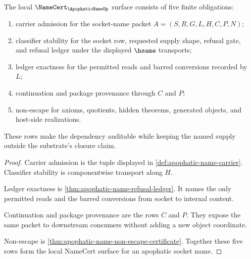 \begin{theorem}
\label{thm:apophatic-name-obligation-surface}
The local $\NameCert_{\ApophaticNameUp}$ surface consists of five finite obligations:
\begin{enumerate}
\item carrier admission for the socket-name packet $A=(S,R,G,L,H,C,P,N)$;
\item classifier stability for the socket row, requested supply shape, refusal gate, and refusal ledger under the displayed $\hsame$ transports;
\item ledger exactness for the permitted reads and barred conversions recorded by $L$;
\item continuation and package provenance through $C$ and $P$;
\item non-escape for axioms, quotients, hidden theorems, generated objects, and host-side realizations.
\end{enumerate}
These rows make the dependency auditable while keeping the named supply outside the substrate's closure claim.
\end{theorem}
\begin{proof}
Carrier admission is the tuple displayed in \autoref{def:apophatic-name-carrier}. Classifier stability is componentwise transport along $H$.

Ledger exactness is \autoref{thm:apophatic-name-refusal-ledger}. It names the only permitted reads and the barred conversions from socket to internal content.

Continuation and package provenance are the rows $C$ and $P$. They expose the same packet to downstream consumers without adding a new object coordinate.

Non-escape is \autoref{thm:apophatic-name-non-escape-certificate}. Together these five rows form the local NameCert surface for an apophatic socket name.
\end{proof}

